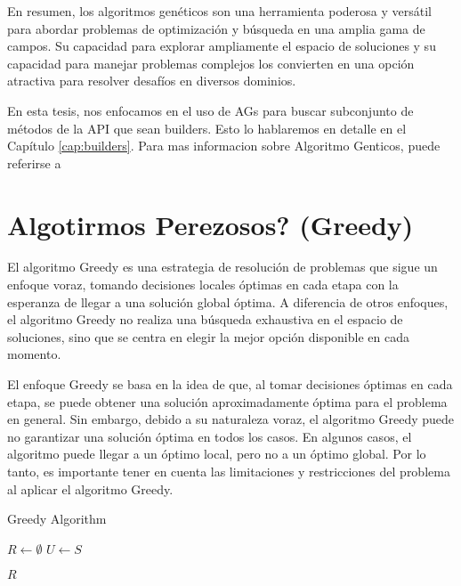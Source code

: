 En resumen, los algoritmos genéticos son una herramienta poderosa y versátil para abordar problemas de optimización y búsqueda en una amplia gama de campos. Su capacidad para explorar ampliamente el espacio de soluciones y su capacidad para manejar problemas complejos los convierten en una opción atractiva para resolver desafíos en diversos dominios.

En esta tesis, nos enfocamos en el uso de AGs para buscar subconjunto de métodos de la API que sean builders. Esto lo hablaremos en detalle en el Capítulo \ref{cap:builders}. Para mas informacion sobre Algoritmo Genticos, puede referirse a \cite{dejong2006evolutionary} 


\section{Algotirmos Perezosos? (Greedy)}

El algoritmo Greedy es una estrategia de resolución de problemas que sigue un enfoque voraz, tomando decisiones locales óptimas en cada etapa con la esperanza de llegar a una solución global óptima. A diferencia de otros enfoques, el algoritmo Greedy no realiza una búsqueda exhaustiva en el espacio de soluciones, sino que se centra en elegir la mejor opción disponible en cada momento.

El enfoque Greedy se basa en la idea de que, al tomar decisiones óptimas en cada etapa, se puede obtener una solución aproximadamente óptima para el problema en general. Sin embargo, debido a su naturaleza voraz, el algoritmo Greedy puede no garantizar una solución óptima en todos los casos. En algunos casos, el algoritmo puede llegar a un óptimo local, pero no a un óptimo global. Por lo tanto, es importante tener en cuenta las limitaciones y restricciones del problema al aplicar el algoritmo Greedy.

\begin{algorithm}[H]
  \SetAlgoLined

  \caption{Greedy Algorithm}


  \BlankLine
  $R \gets \emptyset$ 
  $U \gets S$ 

  \BlankLine

  \BlankLine
  \Return $R$ 

\end{algorithm}

